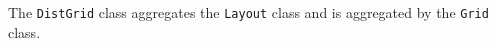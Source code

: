 %


The {\tt DistGrid} class aggregates the {\tt Layout} class and is
aggregated by the {\tt Grid} class.
